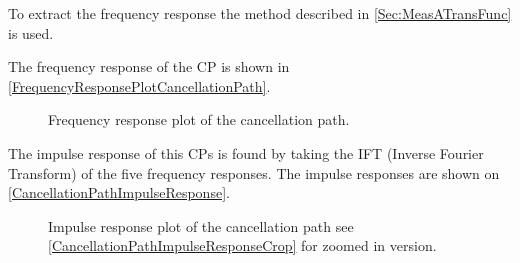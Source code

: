 To extract the frequency response the method described in \autoref{Sec:MeasATransFunc} is used.



The frequency response of the CP is shown in \autoref{FrequencyResponsePlotCancellationPath}.

\begin{figure}[H]
	\centering
	
	\caption{Frequency response plot of the cancellation path.}
	\label{FrequencyResponsePlotCancellationPath}
\end{figure}

The impulse response of this CPs is found by taking the IFT (Inverse Fourier Transform) of the five frequency responses. 
The impulse responses are shown on \autoref{CancellationPathImpulseResponse}.

\begin{figure}[H]
	\centering
	
	\caption{Impulse response plot of the cancellation path see \autoref{CancellationPathImpulseResponseCrop} for zoomed in version.}
	\label{CancellationPathImpulseResponse}
\end{figure}



